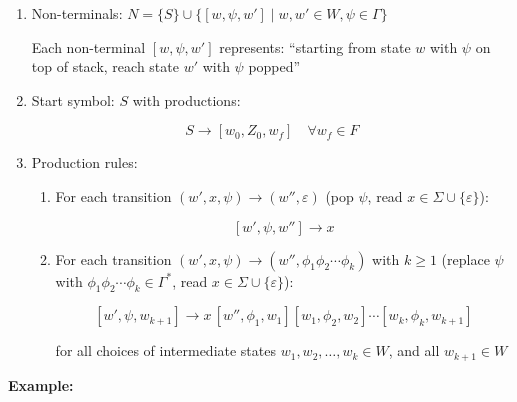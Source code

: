 \documentclass[12pt,a4paper,openany]{article}
\begin{document}
\begin{enumerate}
\item Non-terminals: $N = \{S\} \cup \{[w, \psi, w'] \mid w, w' \in W, \psi \in \Gamma\}$

Each non-terminal $[w, \psi, w']$ represents: ``starting from state $w$ with $\psi$ on top of stack, reach state $w'$ with $\psi$ popped''

\item Start symbol: $S$ with productions:

\[S \to [w_0, Z_0, w_f] \quad \forall w_f \in F\]

\item Production rules:

\begin{enumerate}
\item For each transition $(w', x, \psi) \to (w'', \varepsilon)$ (pop $\psi$, read $x \in \Sigma \cup \{\varepsilon\}$):

\[[w', \psi, w''] \to x\]

\item For each transition $(w', x, \psi) \to (w'', \phi_1 \phi_2 \cdots \phi_k)$ with $k \geq 1$ (replace $\psi$ with $\phi_1 \phi_2 \cdots \phi_k \in \Gamma^*$, read $x \in \Sigma \cup \{\varepsilon\}$):

\[
[w', \psi, w_{k+1}] \to x\,[w'', \phi_1, w_1][w_1, \phi_2, w_2] \cdots [w_k, \phi_k, w_{k+1}]
\]

for all choices of intermediate states $w_1, w_2, \ldots, w_k \in W$, and all $w_{k+1} \in W$
\end{enumerate}

\end{enumerate}

\textbf{Example:}
\end{document}

